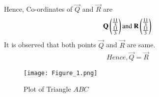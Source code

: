 \documentclass[journal]{IEEEtran}
\numberwithin{equation}{enumi}
\numberwithin{figure}{enumi}
\begin{document}
Hence, Co-ordinates of $\vec{Q}$ and $\vec{R}$ are\\
\begin{align}
    \vec{Q}\myvec{\frac{11}{3}\\\frac{11}{3}} \text{and}\ \vec{R}\myvec{\frac{11}{3}\\\frac{11}{3}}
\end{align}
It is observed that both points $\vec{Q}$ and $\vec{R}$ are same.\\
\begin{align}
	Hence,\vec{Q}=\vec{R}
\end{align}

\begin{figure}[h!]
   \centering
   \texttt{[image: Figure\_1.png]}
   \caption{Plot of Triangle $ABC$}
   \label{stemplot}
\end{figure}
\end{document}
